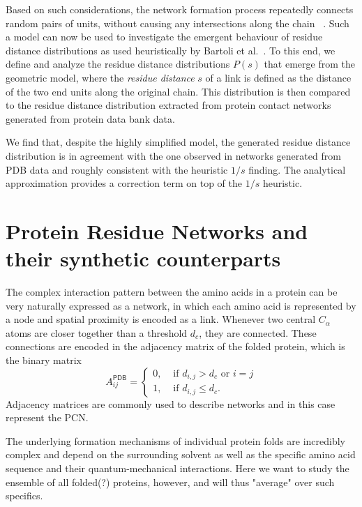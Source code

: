 \documentclass[
reprint,
twocolumn,
amsmath,amssymb,superscriptaddress,aps,
pre]{revtex4-1}
\newcommand{\blue}[1]{\textcolor{blue!80!black}{#1}}
\begin{document}
Based on such considerations, the network formation process repeatedly connects random pairs of units, without causing any intersections along the chain ~\cite{molkenthin2016scaling}. Such a model can now be used to investigate the emergent behaviour of residue distance distributions as used heuristically by Bartoli et al.~\cite{bartoli2008effect}. To this end, we define and analyze the residue distance distributions $P(s)$ that emerge from the geometric model, where the \emph{residue distance} $s$ of a link is defined as the distance of the two end units along the original chain.
This distribution is then compared to the residue distance distribution extracted from protein contact networks generated from protein data bank data. 

We find that, despite the highly simplified model, the generated residue distance distribution is in agreement with the one observed in networks generated from PDB data and roughly consistent with the heuristic $1/s$ finding. The analytical approximation provides a correction term on top of the $1/s$ heuristic.


\section*{Protein Residue Networks and their synthetic counterparts}
The complex interaction pattern between the amino acids in a protein can be very naturally expressed as a network, in which each amino acid is represented by a node and spatial proximity is encoded as a link. Whenever two central $C_\alpha$ atoms are closer together than a threshold $d_c$, they are connected. These connections are encoded in the adjacency matrix of the folded protein, which is the binary matrix
\begin{equation}
  A^{\textsf{PDB}}_{ij}=
  \begin{cases}
   0, & \text{ if } d_{i,j}>d_c \text{ or } i=j\\
      1, & \text{ if } d_{i,j}\leq d_c .
      \end{cases}
    \label{eq:aij}
\end{equation}
Adjacency matrices are commonly used to describe networks and in this case represent the PCN.

The underlying formation mechanisms of individual protein folds are incredibly complex and depend on the surrounding solvent as well as the specific amino acid sequence and their quantum-mechanical interactions. Here we want to study the ensemble of all \blue{folded(?)} proteins, however, and will thus "average" over such specifics.
\end{document}
